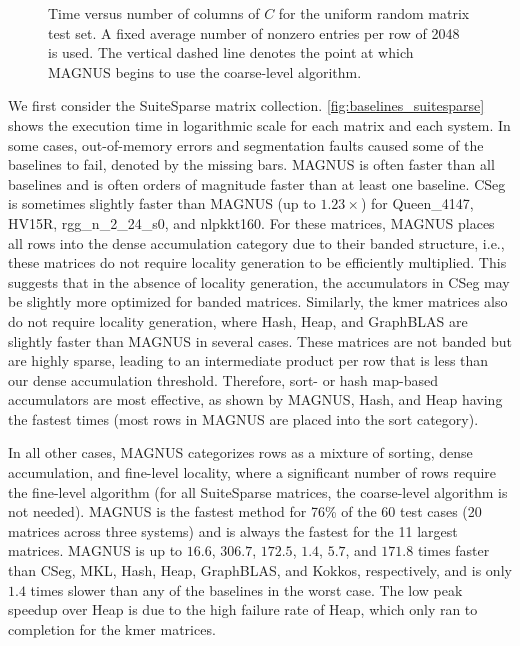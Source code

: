 \begin{figure}[htbp]
\begin{tabular}{ccc}
\end{tabular} 
\caption{Time versus number of columns of $C$ for the uniform random matrix test set.
A fixed average number of nonzero entries per row of 2048 is used.
The vertical dashed line denotes the point at which MAGNUS begins to use the coarse-level algorithm.}
\label{fig:massiveERs_varyScale}
\end{figure}

We first consider the SuiteSparse matrix collection.
\autoref{fig:baselines_suitesparse} shows the execution time in logarithmic scale for each matrix and each system.
In some cases, out-of-memory errors and segmentation faults caused some of the baselines to fail, denoted by the missing bars.
MAGNUS is often faster than all baselines and is often orders of magnitude faster than at least one baseline.
CSeg is sometimes slightly faster than MAGNUS (up to $1.23\times$) for Queen\_4147, HV15R, rgg\_n\_2\_24\_s0, and nlpkkt160.
For these matrices, MAGNUS places all rows into the dense accumulation category due to their banded structure, i.e., these matrices do not require locality generation to be efficiently multiplied.
This suggests that in the absence of locality generation, the accumulators in CSeg may be slightly more optimized for banded matrices.
Similarly, the kmer matrices also do not require locality generation, where Hash, Heap, and GraphBLAS are slightly faster than MAGNUS in several cases.
These matrices are not banded but are highly sparse, leading to an intermediate product per row that is less than our dense accumulation threshold.
Therefore, sort- or hash map-based accumulators are most effective, as shown by MAGNUS, Hash, and Heap having the fastest times (most rows in MAGNUS are placed into the sort category).

In all other cases, MAGNUS categorizes rows as a mixture of sorting, dense accumulation, and fine-level locality, 
where a significant number of rows require the fine-level algorithm (for all SuiteSparse matrices, the coarse-level algorithm is not needed).
MAGNUS is the fastest method for 76\% of the 60 test cases (20 matrices across three systems) and is always the fastest for the 11 largest matrices.
MAGNUS is up to $16.6$, $306.7$, $172.5$, $1.4$, $5.7$, and $171.8$ times faster than CSeg, MKL, Hash, Heap, GraphBLAS, and Kokkos, respectively, and is only $1.4$ times slower than any of the baselines in the worst case.
The low peak speedup over Heap is due to the high failure rate of Heap, which only ran to completion for the kmer matrices.


